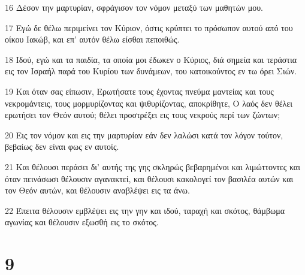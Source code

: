 \par 16 Δέσον την μαρτυρίαν, σφράγισον τον νόμον μεταξύ των μαθητών μου.
\par 17 Εγώ δε θέλω περιμείνει τον Κύριον, όστις κρύπτει το πρόσωπον αυτού από του οίκου Ιακώβ, και επ' αυτόν θέλω είσθαι πεποιθώς.
\par 18 Ιδού, εγώ και τα παιδία, τα οποία μοι έδωκεν ο Κύριος, διά σημεία και τεράστια εις τον Ισραήλ παρά του Κυρίου των δυνάμεων, του κατοικούντος εν τω όρει Σιών.
\par 19 Και όταν σας είπωσιν, Ερωτήσατε τους έχοντας πνεύμα μαντείας και τους νεκρομάντεις, τους μορμυρίζοντας και ψιθυρίζοντας, αποκρίθητε, Ο λαός δεν θέλει ερωτήσει τον Θεόν αυτού; θέλει προστρέξει εις τους νεκρούς περί των ζώντων;
\par 20 Εις τον νόμον και εις την μαρτυρίαν εάν δεν λαλώσι κατά τον λόγον τούτον, βεβαίως δεν είναι φως εν αυτοίς.
\par 21 Και θέλουσι περάσει δι' αυτής της γης σκληρώς βεβαρημένοι και λιμώττοντες και όταν πεινάσωσι θέλουσιν αγανακτεί, και θέλουσι κακολογεί τον βασιλέα αυτών και τον Θεόν αυτών, και θέλουσιν αναβλέψει εις τα άνω.
\par 22 Έπειτα θέλουσιν εμβλέψει εις την γην και ιδού, ταραχή και σκότος, θάμβωμα αγωνίας και θέλουσιν εξωσθή εις το σκότος.

\chapter{9}

